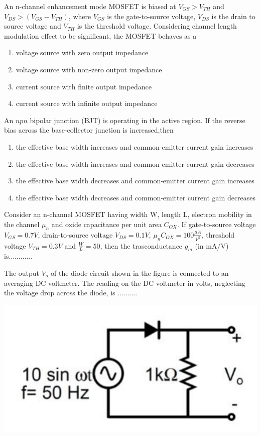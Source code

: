 \item An n-channel enhancement mode MOSFET is biased at $V_{GS} > V_{TH}$ and $V_{DS} > (V_{GS} - V_{TH})$, where $V_{GS}$ is the gate-to-source voltage, $V_{DS}$ is the drain to source voltage and $V_{TH}$ is the threshold voltage. Considering channel length modulation effect to be significant, the MOSFET behaves as a 
\begin{enumerate}
\item voltage source with zero output impedance
\item voltage source with non-zero output impedance
\item current source with finite output impedance
\item current source with infinite output impedance
\end{enumerate}

\item An $npn$ bipolar junction (BJT) is operating in the active region. If the reverse bias across the base-collector junction is increased,then
\begin{enumerate}
\item the effective base width increases and common-emitter current gain increases
\item the effective base width increases and common-emitter current gain decreases
\item the effective base width decreases and common-emitter current gain increases
\item the effective base width decreases and common-emitter current gain decreases
\end{enumerate}

\item Consider an n-channel MOSFET having width W, length L, electron mobility in the channel $ \mu_n$ and oxide capacitance per unit area $ C_{OX}$. If gate-to-source voltage $V_{GS} = 0.7 V$, drain-to-source voltage $V_{DS} = 0.1 V$, $\mu_{n} C_{OX} = 100\frac{\mu A}{V^2}$, threshold voltage $ V_{TH} = 0.3 V$ and   $\frac{W}{L} = 50$, then the trasconductance $g_{m}$ (in mA/V) is............


\item The output $ V_{o}$ of the diode circuit shown in the figure is connected to an averaging DC voltmeter. The reading on the DC voltmeter in volts, neglecting the voltage drop across the diode, is ..........

\includegraphics[scale=0.4]{12}

